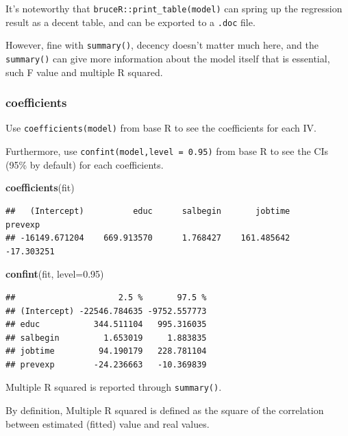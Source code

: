 \documentclass[
]{ctexart}
\newenvironment{Shaded}{\begin{snugshade}}{\end{snugshade}}
\newcommand{\AttributeTok}[1]{\textcolor[rgb]{0.13,0.29,0.53}{#1}}
\newcommand{\FloatTok}[1]{\textcolor[rgb]{0.00,0.00,0.81}{#1}}
\newcommand{\FunctionTok}[1]{\textcolor[rgb]{0.13,0.29,0.53}{\textbf{#1}}}
\newcommand{\NormalTok}[1]{#1}
\begin{document}
It's noteworthy that \texttt{bruceR::print\_table(model)} can spring up
the regression result as a decent table, and can be exported to a
\texttt{.doc} file.

However, fine with \texttt{summary()}, decency doesn't matter much here,
and the \texttt{summary()} can give more information about the model
itself that is essential, such F value and multiple R squared.

\hypertarget{coefficients}{%
\subsubsection{coefficients}\label{coefficients}}

Use \texttt{coefficients(model)} from base R to see the coefficients for
each IV.

Furthermore, use \texttt{confint(model,level\ =\ 0.95)} from base R to
see the CIs (95\% by default) for each coefficients.

\begin{Shaded}
\begin{Highlighting}[]
\FunctionTok{coefficients}\NormalTok{(fit)}
\end{Highlighting}
\end{Shaded}

\begin{verbatim}
##   (Intercept)          educ      salbegin       jobtime       prevexp 
## -16149.671204    669.913570      1.768427    161.485642    -17.303251
\end{verbatim}

\begin{Shaded}
\begin{Highlighting}[]
\FunctionTok{confint}\NormalTok{(fit, }\AttributeTok{level=}\FloatTok{0.95}\NormalTok{)}
\end{Highlighting}
\end{Shaded}

\begin{verbatim}
##                     2.5 %       97.5 %
## (Intercept) -22546.784635 -9752.557773
## educ           344.511104   995.316035
## salbegin         1.653019     1.883835
## jobtime         94.190179   228.781104
## prevexp        -24.236663   -10.369839
\end{verbatim}

Multiple R squared is reported through \texttt{summary()}.

By definition, Multiple R squared is defined as the square of the
correlation between estimated (fitted) value and real values.
\end{document}
